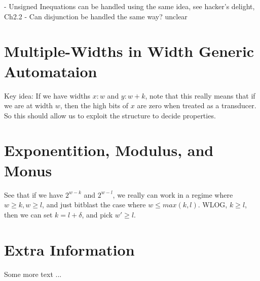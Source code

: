 \documentclass[withindex,glossary]{cam-thesis}
\begin{document}
- Unsigned Inequations can be handled using the same idea, see hacker's delight, Ch2.2
- Can disjunction be handled the same way? unclear

\chapter{Multiple-Widths in Width Generic Automataion}

Key idea: If we have widths $x : w$ and $ y : w+k$, note that this really means that
if we are at width $w$, then the high bits of $x$ are zero when treated as a transducer.
So this should allow us to exploit the structure to decide properties.

\chapter{Exponentition, Modulus, and Monus}

See that if we have $2^{w-k}$ and $2^{w - l}$, we really can work in a regime where $w \geq k, w \geq l$,
and just bitblast the case where $w \leq max(k, l)$.
WLOG, $k \geq l$, then we can set $k = l + \delta$, and pick $w' \geq l$.


%

\renewcommand{\bibname}{References}
\cleardoublepage
{}
{}






\appendix

\chapter{Extra Information}
Some more text ...



\printthesisindex
\end{document}
